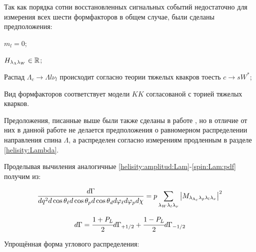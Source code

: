 Так как порядка сотни восстановленных сигнальных событий 
недостаточно для измерения всех шести формфакторов в общем случае, 
были сделаны предположения:

\newdot $m_l = 0$;

\newdot $H_{\lambda_\Lambda \lambda_W} \in \mathbb{R}$;

\newdot Распад $\Lambda_c \to \Lambda l \nu_l$ происходит согласно теории тяжелых квакров тоесть $c \to s W^*$;

\newdot Вид формфакторов соответствует модели $KK$ согласованой с торией тяжелых кварков.

Предоложения, писанные выше были также сделаны в работе \cite{CLEO2023}, но в отличие от них 
в данной работе не делается предположения о равномерном распределении направления спина $\Lambda$,
а распределен согласно измерениям продленным в разделе \ref{helisity:Lambda}.

Проделывая вычиления аналогичные \ref{helisity:amplitud:Lam}-\ref{spin:Lam:pdf} получим из:

\begin{eqnarray}
    \frac{d\Gamma}{dq^2 d\cos\theta_\ell d\cos\theta_p d\cos\theta_d d\varphi_\ell d\varphi_p d\chi} = 
    p\sum_{\lambda_W \lambda_l \lambda_\nu } \abs{M_{\lambda_{\Lambda_c}\lambda_{p}\lambda_{l}\lambda_{\nu}} }^2
\end{eqnarray}

\begin{eqnarray}
    d\Gamma = \cfrac{1+P_L}{2}d\Gamma_{+1/2} + \cfrac{1-P_L}{2}d\Gamma_{-1/2}
\end{eqnarray}

Упрощённая форма углового распределения:


